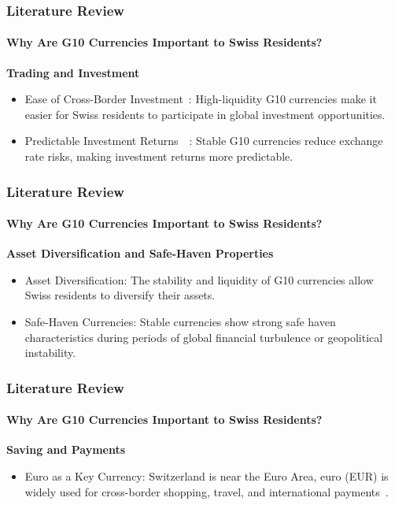 \documentclass[10pt]{beamer}
\begin{document}
\begin{frame}
\frametitle{Literature Review}
\framesubtitle{Why Are G10 Currencies Important to Swiss Residents?}
\textbf{Trading and Investment}
\begin{itemize}
    \item Ease of Cross-Border Investment~\cite{rogoff2000six}: High-liquidity G10 currencies make it easier for Swiss residents to participate in global investment opportunities.
    \item Predictable Investment Returns~\cite{campbell2002strategic}~\cite{engel2016exchange}: Stable G10 currencies reduce exchange rate risks, making investment returns more predictable.
\end{itemize}
\end{frame}
\begin{frame}
\frametitle{Literature Review}
\framesubtitle{Why Are G10 Currencies Important to Swiss Residents?}
\textbf{Asset Diversification and Safe-Haven Properties}   
\begin{itemize}
    \item Asset Diversification: The stability and liquidity of G10 currencies allow Swiss residents to diversify their assets. ~\cite{ito2020currency}
    \item Safe-Haven Currencies: Stable currencies show strong safe haven characteristics during periods of global financial turbulence or geopolitical instability.~\cite{ranaldo2010safe}
\end{itemize}
\end{frame}
\begin{frame}
\frametitle{Literature Review}
\framesubtitle{Why Are G10 Currencies Important to Swiss Residents?}
\textbf{Saving and Payments}
\begin{itemize}
    \item Euro as a Key Currency: Switzerland is near the Euro Area, euro (EUR) is widely used for cross-border shopping, travel, and international payments~\cite{sif_imf_reports}.
\end{itemize}
\end{frame}
\end{document}
